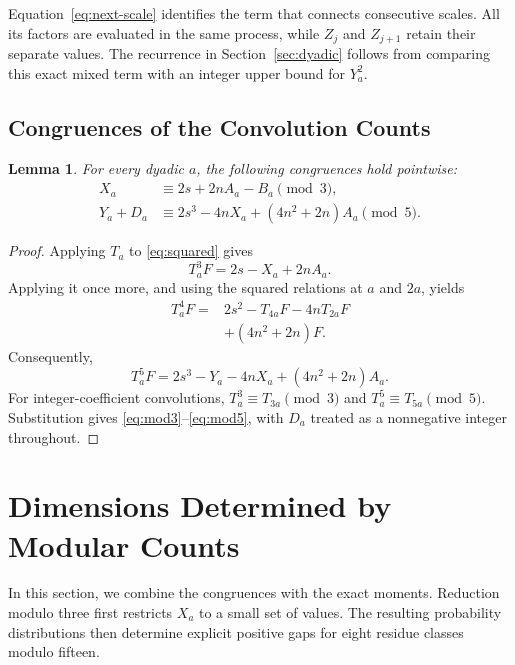 \documentclass[12pt,letterpaper,onecolumn]{article}
\newtheorem{lemma}[theorem]{Lemma}
\theoremstyle{definition}
\begin{document}
Equation~\eqref{eq:next-scale} identifies the term that connects consecutive scales. All its factors are evaluated in the same process, while $Z_j$ and $Z_{j+1}$ retain their separate values. The recurrence in Section~\ref{sec:dyadic} follows from comparing this exact mixed term with an integer upper bound for $Y_a^2$.

\subsection{Congruences of the Convolution Counts}
\begin{lemma}\label{lem:congruences}
For every dyadic $a$, the following congruences hold pointwise:
\begin{align}
 X_a&\equiv2s+2nA_a-B_a\pmod3,\label{eq:mod3}\\
 Y_a+D_a&\equiv2s^3-4nX_a+(4n^2+2n)A_a\pmod5.
 \label{eq:mod5}
\end{align}
\end{lemma}
\begin{proof}
Applying $T_a$ to \eqref{eq:squared} gives
\[
 T_a^3F=2s-X_a+2nA_a.
\]
Applying it once more, and using the squared relations at $a$ and $2a$, yields
\begin{align*}
 T_a^4F={}&2s^2-T_{4a}F-4nT_{2a}F\\
 &+(4n^2+2n)F.
\end{align*}
Consequently,
\[
 T_a^5F=2s^3-Y_a-4nX_a+(4n^2+2n)A_a.
\]
For integer-coefficient convolutions, $T_a^3\equiv T_{3a}\pmod3$ and $T_a^5\equiv T_{5a}\pmod5$. Substitution gives \eqref{eq:mod3}--\eqref{eq:mod5}, with $D_a$ treated as a nonnegative integer throughout.
\end{proof}

 \section{Dimensions Determined by Modular Counts}\label{sec:residues}
In this section, we combine the congruences with the exact moments. Reduction modulo three first restricts $X_a$ to a small set of values. The resulting probability distributions then determine explicit positive gaps for eight residue classes modulo fifteen.
\end{document}
